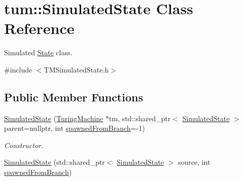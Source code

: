 \hypertarget{classtum_1_1_simulated_state}{\section{tum\-:\-:\-Simulated\-State \-Class \-Reference}
\label{classtum_1_1_simulated_state}
}


\-Simulated \hyperlink{classtum_1_1_state}{\-State} class.  




{\ttfamily \#include $<$\-T\-M\-Simulated\-State.\-h$>$}

\subsection*{\-Public \-Member \-Functions}
\begin{DoxyCompactItemize}
\item 
\hyperlink{classtum_1_1_simulated_state_a3a68b86d639fc1741a9f0f1f2b67dc0f}{\-Simulated\-State} (\hyperlink{classtum_1_1_turing_machine}{\-Turing\-Machine} $\ast$tm, std\-::shared\-\_\-ptr$<$ \hyperlink{classtum_1_1_simulated_state}{\-Simulated\-State} $>$ parent=nullptr, int \hyperlink{classtum_1_1_simulated_state_a6c1dc2d948e9f2eae5f01853ec10047a}{spawned\-From\-Branch}=-\/1)
\begin{DoxyCompactList}\small\item\em \-Constructor. \end{DoxyCompactList}\item 
\hypertarget{classtum_1_1_simulated_state_a62f71a18fa27e30e16dc6e0b9a9758fe}{\hyperlink{classtum_1_1_simulated_state_a62f71a18fa27e30e16dc6e0b9a9758fe}{\-Simulated\-State} (std\-::shared\-\_\-ptr$<$ \hyperlink{classtum_1_1_simulated_state}{\-Simulated\-State} $>$ source, int \hyperlink{classtum_1_1_simulated_state_a6c1dc2d948e9f2eae5f01853ec10047a}{spawned\-From\-Branch})}\label{classtum_1_1_simulated_state_a62f71a18fa27e30e16dc6e0b9a9758fe}


\end{DoxyCompactItemize}
